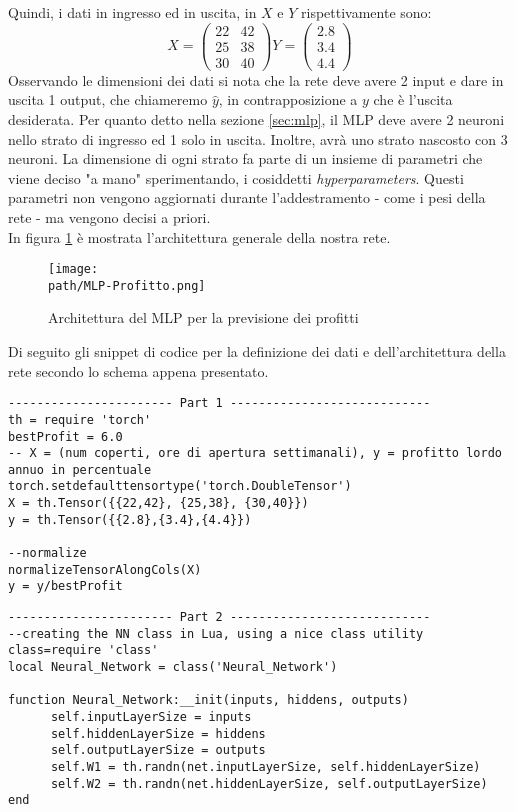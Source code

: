 Quindi, i dati in ingresso ed in uscita, in $X$ e $Y$ rispettivamente sono:
\[
X = \begin{pmatrix}
22 & 42\\
25 & 38 \\
30 & 40
\end{pmatrix}
%
Y = \begin{pmatrix}
2.8\\
3.4 \\
4.4
\end{pmatrix}
\]
Osservando le dimensioni dei dati si nota che la rete deve avere 2 input e dare in uscita 1 output, che chiameremo $\hat{y}$, in contrapposizione a $y$ che è l'uscita desiderata. Per quanto detto nella sezione \ref{sec:mlp}, il MLP deve avere 2 neuroni nello strato di ingresso ed 1 solo in uscita. Inoltre, avrà uno strato nascosto con 3 neuroni. La dimensione di ogni strato fa parte di un insieme di parametri che viene deciso "a mano" sperimentando, i cosiddetti \emph{hyperparameters}. Questi parametri non vengono aggiornati durante l'addestramento - come i pesi della rete - ma vengono decisi a priori. \\In figura \ref{fig:mlp} è mostrata l'architettura generale della nostra rete. \newpage
\begin{figure}[h!]
 \centering
 \texttt{[image: \\path/MLP-Profitto.png]}
 \caption{Architettura del MLP per la previsione dei profitti}
 \label{fig:mlp}
\end{figure}

Di seguito gli snippet di codice per la definizione dei dati e dell'architettura della rete secondo lo schema appena presentato.
\begin{lstlisting}[language={[5.2]Lua}]
----------------------- Part 1 ----------------------------
th = require 'torch'
bestProfit = 6.0
-- X = (num coperti, ore di apertura settimanali), y = profitto lordo annuo in percentuale
torch.setdefaulttensortype('torch.DoubleTensor')
X = th.Tensor({{22,42}, {25,38}, {30,40}})
y = th.Tensor({{2.8},{3.4},{4.4}})

--normalize
normalizeTensorAlongCols(X)
y = y/bestProfit

\end{lstlisting}

\begin{lstlisting}[language={[5.2]Lua}]
----------------------- Part 2 ----------------------------
--creating the NN class in Lua, using a nice class utility
class=require 'class'
local Neural_Network = class('Neural_Network')

function Neural_Network:__init(inputs, hiddens, outputs)
      self.inputLayerSize = inputs
      self.hiddenLayerSize = hiddens
      self.outputLayerSize = outputs
      self.W1 = th.randn(net.inputLayerSize, self.hiddenLayerSize)
      self.W2 = th.randn(net.hiddenLayerSize, self.outputLayerSize)
end
\end{lstlisting}

